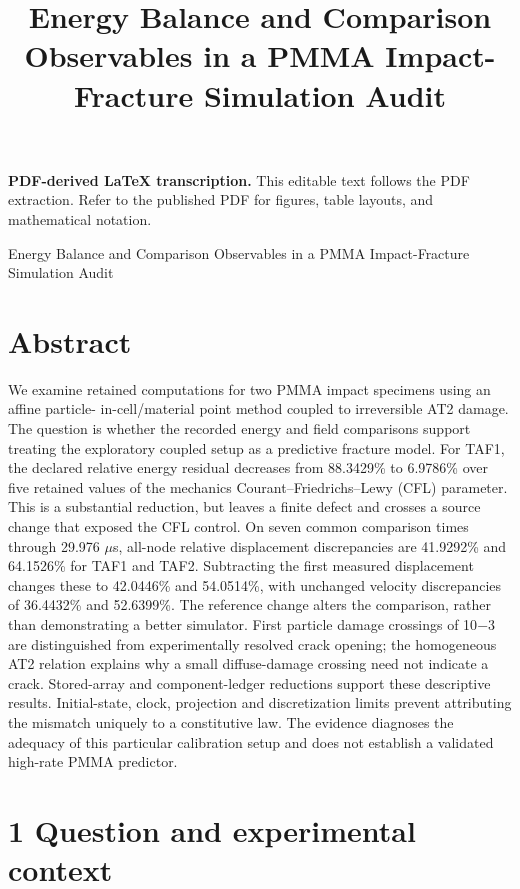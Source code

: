 \documentclass[11pt]{article}
\title{Energy Balance and Comparison Observables in a PMMA Impact-Fracture Simulation Audit}
\author{}
\date{}
\begin{document}
\maketitle
\noindent\textbf{PDF-derived LaTeX transcription.} This editable text follows the PDF extraction. Refer to the published PDF for figures, table layouts, and mathematical notation.


Energy Balance and Comparison Observables in a PMMA
Impact-Fracture Simulation Audit

\section*{Abstract}

We examine retained computations for two PMMA impact specimens using an affine particle-
in-cell/material point method coupled to irreversible AT2 damage. The question is whether
the recorded energy and field comparisons support treating the exploratory coupled setup as
a predictive fracture model. For TAF1, the declared relative energy residual decreases from
88.3429\% to 6.9786\% over five retained values of the mechanics Courant–Friedrichs–Lewy (CFL)
parameter. This is a substantial reduction, but leaves a finite defect and crosses a source
change that exposed the CFL control. On seven common comparison times through 29.976 \ensuremath{\mu}s,
all-node relative displacement discrepancies are 41.9292\% and 64.1526\% for TAF1 and TAF2.
Subtracting the first measured displacement changes these to 42.0446\% and 54.0514\%, with
unchanged velocity discrepancies of 36.4432\% and 52.6399\%. The reference change alters the
comparison, rather than demonstrating a better simulator. First particle damage crossings
of 10\ensuremath{-}3 are distinguished from experimentally resolved crack opening; the homogeneous AT2
relation explains why a small diffuse-damage crossing need not indicate a crack. Stored-array and
component-ledger reductions support these descriptive results. Initial-state, clock, projection
and discretization limits prevent attributing the mismatch uniquely to a constitutive law. The
evidence diagnoses the adequacy of this particular calibration setup and does not establish a
validated high-rate PMMA predictor.

\section*{1 Question and experimental context}
\end{document}
